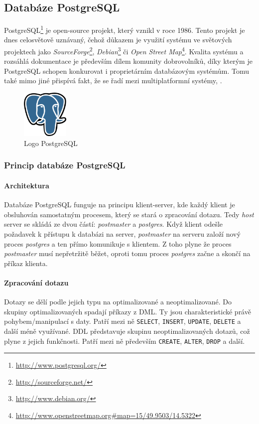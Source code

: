 \documentclass[a4paper,12pt,oneside]{report}
\begin{document}
\subsection{Databáze PostgreSQL}
PostgreSQL\footnote{\url{http://www.postgresql.org/}} je open-source
projekt, který vznikl v roce 1986. Tento projekt je dnes celosvětově
uznávaný, čehož důkazem je využití systému ve světových projektech
jako \textit{SourceForge}\footnote{\url{http://sourceforge.net/}},
\textit{Debian}\footnote{\url{http://www.debian.org/}} či \textit{Open
  Street
  Map}\footnote{\url{http://www.openstreetmap.org\#map=15/49.9503/14.5322}}. Kvalita
systému a rozsáhlá dokumentace je především dílem komunity
dobrovolníků, díky kterým je PostgreSQL schopen konkurovat i
proprietárním databázovým systémům. Tomu také mimo jiné přispívá fakt,
že se řadí mezi multiplatformní systémy, \cite{postgre}.

\begin{figure}[h!]
    \centering
    \includegraphics[width=0.2\textwidth]{./img/implementace/postgresql.png}
    \caption[Logo PostgreSQL]{\centering Logo PostgreSQL }
 \end{figure}   


\subsubsection{Princip databáze PostgreSQL}
\paragraph*{Architektura}
Databáze PostgreSQL funguje na principu klient-server, kde
každý klient je obsluhován samostatným procesem, který se stará o
zpracování dotazu. Tedy \textit{host} server se skládá ze dvou částí:
\textit{postmaster} a \textit{postgres}.  Když klient odešle požadavek
k přístupu k databázi na server, \textit{postmaster} na serveru založí
nový proces \textit{postgres} a ten přímo komunikuje s klientem. Z
toho plyne že proces \textit{postmaster} musí nepřetržitě běžet,
oproti tomu proces \textit{postgres} začne a skončí na příkaz klienta.


\paragraph*{Zpracování dotazu}
Dotazy se dělí podle jejich typu na optimalizované a
neoptimalizované. Do skupiny optimalizovaných spadají příkazy z
\ac{DML}. Ty jsou charakteristické právě pohybem/manipulací s
daty. Patří mezi ně \texttt{SELECT}, \texttt{INSERT}, \texttt{UPDATE},
\texttt{DELETE} a další méně využívané.    \acs{DDL} představuje skupinu
neoptimalizovaných dotazů, což plyne z jejich funkčnosti. Patří mezi
ně především \texttt{CREATE}, \texttt{ALTER}, \texttt{DROP} a
další. \cite{bares}
\end{document}
